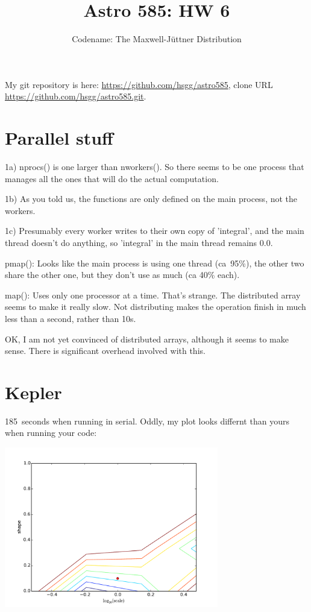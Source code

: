 \documentclass[11pt]{article}
\title{Astro 585: HW 6}
\author{Codename: The Maxwell-Jüttner Distribution}
\begin{document}
\maketitle

My git repository is here: \url{https://github.com/hsgg/astro585}, clone URL
\url{https://github.com/hsgg/astro585.git}.


\section{Parallel stuff}

1a) nprocs() is one larger than nworkers(). So there seems to be one process
that manages all the ones that will do the actual computation.

1b) As you told us, the functions are only defined on the main process, not the
workers.

1c) Presumably every worker writes to their own copy of 'integral', and the
main thread doesn't do anything, so 'integral' in the main thread remains 0.0.

pmap(): Looks like the main process is using one thread (ca~95\%), the other
two share the other one, but they don't use as much (ca 40\% each).

map(): Uses only one processor at a time. That's strange. The distributed array
seems to make it really slow. Not distributing makes the operation finish in
much less than a second, rather than 10s.

OK, I am not yet convinced of distributed arrays, although it seems to make
sense. There is significant overhead involved with this.


\section{Kepler}

185~seconds when running in serial. Oddly, my plot looks differnt than yours
when running your code:
\begin{center}
	\includegraphics[width=0.7\textwidth]{parameterspace_originalserial.pdf}
\end{center}
\end{document}
